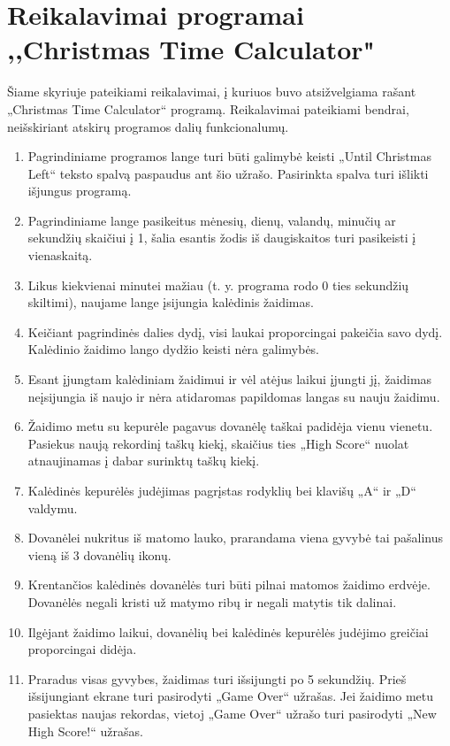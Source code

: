 \documentclass{VUMIFPSkursinis}
\begin{document}
	\section{Reikalavimai programai ,,Christmas Time Calculator"} \label{reikalavimai}
		Šiame skyriuje pateikiami reikalavimai, į kuriuos buvo atsižvelgiama rašant „Christmas Time Calculator“ programą.
		Reikalavimai pateikiami bendrai, neišskiriant atskirų programos dalių funkcionalumų.
		\begin{enumerate}[label=\textbf{R\arabic*}]
			\item Pagrindiniame programos lange turi būti galimybė keisti „Until Christmas Left“ teksto spalvą paspaudus ant šio užrašo.
			Pasirinkta spalva turi išlikti išjungus programą.
			\item Pagrindiniame lange pasikeitus mėnesių, dienų, valandų, minučių ar sekundžių skaičiui į 1, 
			šalia esantis žodis iš daugiskaitos turi
			pasikeisti į vienaskaitą.
			\item Likus kiekvienai minutei mažiau (t. y. programa rodo 0 ties sekundžių skiltimi), naujame lange įsijungia kalėdinis žaidimas.
			\item Keičiant pagrindinės dalies dydį, visi laukai proporcingai pakeičia savo dydį. 
			Kalėdinio žaidimo lango dydžio keisti nėra galimybės.
			\item Esant įjungtam kalėdiniam žaidimui ir vėl atėjus laikui įjungti jį, žaidimas neįsijungia iš naujo ir 
			nėra atidaromas papildomas langas su nauju žaidimu.
			\item Žaidimo metu su kepurėle pagavus dovanėlę taškai padidėja vienu vienetu.
			Pasiekus naują rekordinį taškų kiekį, skaičius ties „High Score“ nuolat atnaujinamas į dabar surinktų taškų kiekį.
			\item Kalėdinės kepurėlės judėjimas pagrįstas rodyklių bei klavišų „A“ ir „D“ valdymu.
			\item Dovanėlei nukritus iš matomo lauko, prarandama viena gyvybė tai pašalinus vieną iš 3 dovanėlių ikonų.
			\item Krentančios kalėdinės dovanėlės turi būti pilnai matomos žaidimo erdvėje. 
			Dovanėlės negali kristi už matymo ribų ir negali matytis tik dalinai.
			\item Ilgėjant žaidimo laikui, dovanėlių bei kalėdinės kepurėlės judėjimo greičiai proporcingai didėja.
			\item Praradus visas gyvybes, žaidimas turi išsijungti po 5 sekundžių.
			Prieš išsijungiant ekrane turi pasirodyti „Game Over“ užrašas.
			Jei žaidimo metu pasiektas naujas rekordas, vietoj „Game Over“ užrašo turi pasirodyti „New High Score!“ užrašas. 
		\end{enumerate}
\end{document}
